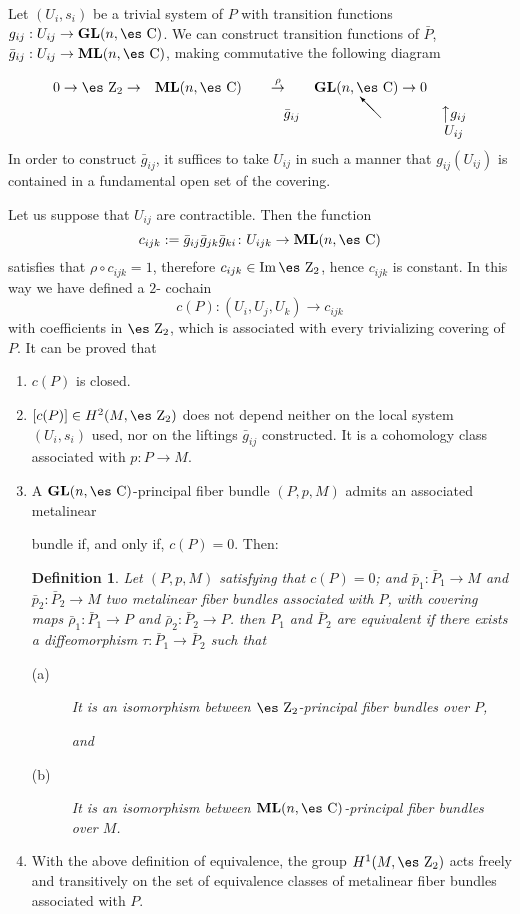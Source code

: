 \documentclass[12pt]{article}
\theoremstyle{plain}
\newtheorem{definition}{Definition}
\def\map#1{\mathrel{\mathop{\to}\limits^{#1}}}
\def\GL{{\bf GL}(n,\Complex )}
\def\ML{{\bf ML}(n,\Complex )}
\def\Zahl{\mbox{\es Z}}
\def\Complex{\mbox{\es C}}
\begin{document}
Let $(U_i,s_i)$ be a trivial system of $P$ with transition functions
$g_{ij} : U_{ij} \to \GL$. We can construct transition functions of
$\bar P$,
$\bar g_{ij} : U_{ij} \to \ML$, making commutative the following diagram

$$
\begin{array}{ccccc}
0 \to \Zahl_2 \to & \ML & \map{\rho} & \GL \to 0
\\
& & \qquad \bar g_{ij}
&
\begin{picture}(15,15)(0,0)
\put(15,0){\vector(-1,1){15}}
\end{picture}
& \big\uparrow g_{ij}
\\
& & & & U_{ij}
\end{array}
$$
In order to construct $\bar g_{ij}$, it suffices to take $U_{ij}$
in such a manner that $g_{ij}(U_{ij})$
is contained in a fundamental open set of the covering.

Let us suppose that $U_{ij}$ are contractible. Then the function
$$
c_{ijk} := \bar g_{ij} \bar g_{jk} \bar g_{ki} \colon U_{ijk} \to \ML
$$
satisfies that $\rho \circ c_{ijk} = 1$, therefore
$c_{ijk} \in {\rm Im}\, \Zahl_2$, hence $c_{ijk}$ is constant.
In this way we have defined a $2$- cochain
$$
c(P) : (U_i,U_j,U_k) \to c_{ijk}
$$
with coefficients in $\Zahl_2$,
which is associated with every trivializing covering of $P$.
It can be proved that
\begin{enumerate}
\item
$c(P)$ is closed.
\item
$[c(P)] \in H^2(M,\Zahl_2)$ does not depend neither on the local system
$(U_i,s_i)$ used, nor on the liftings $\bar g_{ij}$ constructed.
It is a cohomology class associated with $p\colon P \to M$.
\item
A $\GL$-principal fiber bundle $(P,p,M)$ admits an associated metalinear

bundle
if, and only if, $c(P)=0$. Then:

\begin{definition}
Let $(P,p,M)$ satisfying that $c(P)=0$; and
$\bar p_1:\bar P_1 \to M$ and $\bar p_2:\bar P_2 \to M$
two metalinear fiber bundles associated with $P$,
with covering maps $\bar \rho_1\colon\bar P_1 \to P$ and
$\bar \rho_2\colon\bar P_2 \to P$. then $P_1$ and $\bar P_2$ are
{\rm equivalent} if there exists a diffeomorphism
$\tau : \bar P_1 \to \bar P_2$ such that
\begin{description}
\item[{\rm (a)}]
It is an isomorphism between $\Zahl_2$-principal fiber bundles over $P$,

and
\item[{\rm (b)}]
It is an isomorphism between $\ML$-principal fiber bundles over $M$.
\end{description}
\label{amfbeq}
\end{definition}

\item
With the above definition of equivalence, the group $H^1(M,\Zahl_2)$
acts freely and transitively on the set of equivalence classes of
metalinear fiber bundles associated with $P$.
\end{enumerate}
\end{document}
